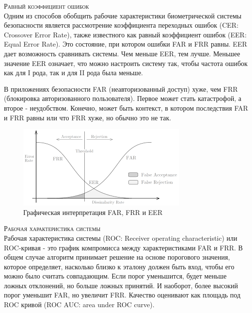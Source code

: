\documentclass[12pt]{article}
\begin{document}
    \noindent\textsc{Равный коэффициент ошибок} \\
    \noindent Одним из способов обобщить рабочие характеристики биометрической системы безопасности является рассмотрение коэффициента переходных ошибок (CER: Crossover Error Rate), также известного как равный коэффициент ошибок (EER: Equal Error Rate). Это состояние, при котором ошибки FAR и FRR равны. EER дает возможность сравнивать системы. Чем меньше EER, тем лучше. Меньшее значение EER означает, что можно настроить систему так, чтобы частота ошибок как для I рода, так и для II рода была меньше. \\

    \par В приложениях безопасности FAR (неавторизованный доступ) хуже, чем FRR (блокировка авторизованного пользователя). Первое может стать катастрофой, а второе - неудобством. Конечно, может быть контекст, в котором последствия FAR и FRR равны или что FRR хуже, но обычно это не так. \\

    \begin{figure}[h]
        \centering
        \includegraphics{EER.png}
        \caption{Графическая интерпретация FAR, FRR и EER}
        \label{sec:Overview:Metrics:fig:FAR_FRR_EER}
    \end{figure}
    \vspace{10mm}

    \noindent\textsc{Рабочая характеристика системы} \\
    \noindent Рабочая характеристика системы (ROC: Receiver operating characteristic) или ROC-кривая - это график компромисса между характеристиками FAR и FRR. В общем случае алгоритм принимает решение на основе порогового значения, которое определяет, насколько близко к эталону должен быть вход, чтобы его можно было считать совпадающим. Если порог уменьшится, будет меньше ложных отклонений, но больше ложных принятий. И наоборот, более высокий порог уменьшит FAR, но увеличит FRR. Качество оценивают как площадь под ROC кривой (ROC AUC: area under ROC curve).
\end{document}
